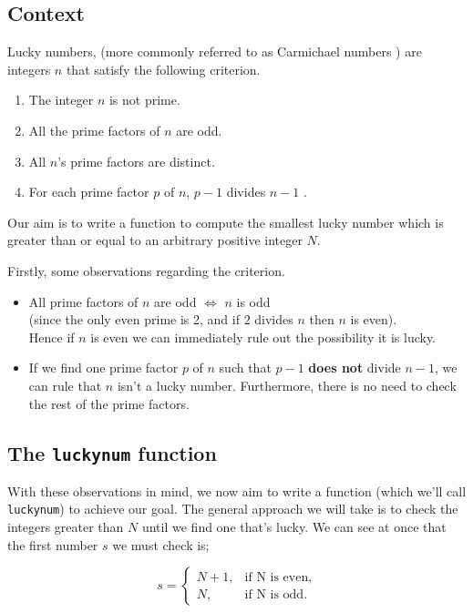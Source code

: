\documentclass[10pt]{article}
\begin{document}
\subsection{Context}
Lucky numbers, (more commonly referred to as Carmichael numbers \cite{carmichael}) are integers $n$ that satisfy the following criterion.

\begin{enumerate}
\item The integer $n$ is not prime.
\item All the prime factors of $n$ are odd.
\item All $n$'s prime factors are distinct.
\item For each prime factor $p$ of $n$, $p - 1$ divides $n-1$ .
\end{enumerate}

Our aim is to write a function to compute the smallest lucky number which is greater than or equal to an arbitrary positive integer $N$. 

Firstly, some observations regarding the criterion.

\begin{itemize}

\item All prime factors of $n$ are odd $\iff$ $n$ is odd\\
 (since the only even prime is 2, and if $2$ divides $n$ then $n$ is even).\\
 
 Hence if $n$ is even we can immediately rule out the possibility it is lucky.
\item If we find one prime factor $p$ of $n$ such that $p -1$ \textbf{does not} divide $n-1$, we can rule that $n$ isn't a lucky number. Furthermore, there is no need to check the rest of the prime factors.
\end{itemize}

\subsection{The \texttt{luckynum} function}

With these observations in mind, we now aim to write a function (which we'll call \texttt{luckynum}) to achieve our goal. The general approach  we will take is to check the integers greater than $N$ until we find one that's lucky. We can see at once that the first number $s$ we must check is;

$$ s = \begin{cases}
               N + 1,& \text{if N is even,}\\
               N, & \text{if N is odd.}
            \end{cases}
$$
\end{document}
